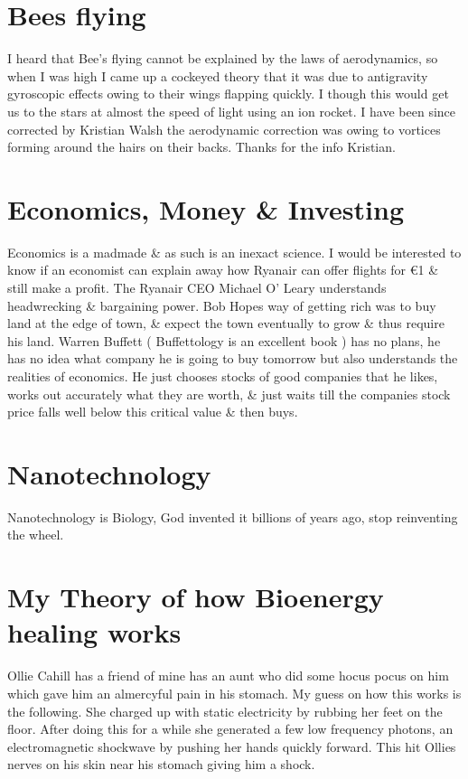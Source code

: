 \documentclass[a4paper,12pt,titlepage]{book}
\begin{document}
\section{Bees flying}
I heard that Bee's flying cannot be explained by the
laws of aerodynamics, so when I was high I came up
a cockeyed theory that it was due to antigravity
gyroscopic effects owing to their wings flapping
quickly. I though this would get us to the stars
at almost the speed of light using an ion rocket.
I have been since corrected by Kristian Walsh
the aerodynamic correction was owing to vortices
forming around the hairs on their backs.
Thanks for the info Kristian.

\section{Economics, Money \& Investing}
Economics is a madmade \& as such is an inexact science.
I would be interested to know if an economist can explain away how Ryanair can
offer flights for \euro1 \& still make a profit.
The Ryanair CEO Michael O' Leary understands headwrecking \& bargaining power.
Bob Hopes way of getting rich was to buy land at the edge of town,
\& expect the town eventually to grow \& thus require his land.
Warren Buffett ( Buffettology is an excellent book )
has no plans, he has no idea what company he is going to buy tomorrow
but also understands the realities of economics.
He just chooses stocks of good companies that he likes,
works out accurately what they are worth,
\& just waits till the companies stock price falls well
below this critical value \& then buys.

\section{Nanotechnology}
Nanotechnology is Biology, God invented it
billions of years ago, stop reinventing the wheel.

\section{My Theory of how Bioenergy healing works}
Ollie Cahill has a friend of mine has an aunt who did some hocus pocus
on him which gave him an almercyful pain in his stomach.
My guess on how this works is the following.
She charged up with static electricity by rubbing her feet on
the floor. After doing this for a while she generated
a few low frequency photons, an electromagnetic shockwave
by pushing her hands quickly forward.
This hit Ollies nerves on his skin near his stomach giving
him a shock.
\end{document}
